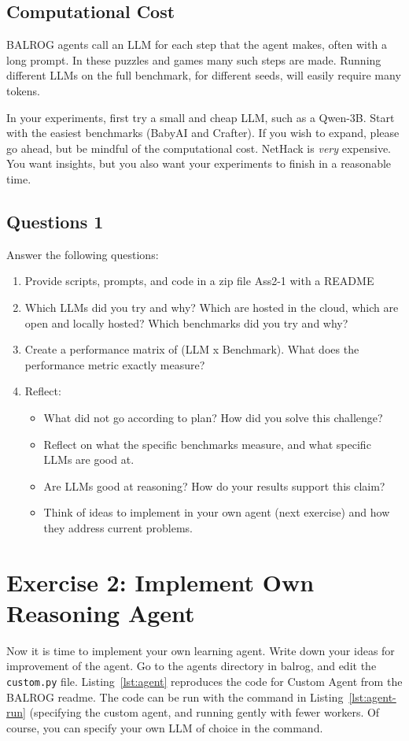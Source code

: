 \documentclass[a4]{article}
\begin{document}
\subsection{Computational Cost}
BALROG agents call an LLM for each step that the agent makes, often with a long prompt. In these puzzles and games many such steps are made. Running  different LLMs on the full benchmark, for different seeds, will easily require  many tokens. 

In your experiments, first try a small and cheap LLM, such as a Qwen-3B. Start with the easiest benchmarks (BabyAI and Crafter). If you wish to expand, please go ahead, but be mindful of the computational cost. NetHack is {\em very} expensive. You want insights, but you also want your experiments to finish in a reasonable time.

\subsection{Questions 1}
Answer the following questions:
\begin{enumerate}
 \item Provide scripts, prompts, and code in a zip file Ass2-1 with a README
\item Which LLMs did you try and why? Which are hosted in the cloud, which are open and locally hosted? Which benchmarks did you try and why? 
\item Create a performance matrix of (LLM x Benchmark). What does the performance metric exactly measure?
\item Reflect: 
\begin{itemize} 
\item What did not go according to plan? How did you solve this challenge? 
\item Reflect on what the specific benchmarks measure, and what specific LLMs are good at. 
\item Are LLMs good at reasoning? How do your results support this claim? 
\item Think of ideas to implement in your own agent (next exercise) and how they address current problems.
\end{itemize}
\end{enumerate}

\section{Exercise 2: Implement Own Reasoning Agent}
Now it is time to implement your own learning agent.
Write down your ideas for improvement of the agent.
Go to the agents directory in balrog, and edit the \verb|custom.py| file.
Listing~\ref{lst:agent} reproduces the code for Custom Agent from the BALROG readme. The code can be run with the command in Listing~\ref{lst:agent-run} (specifying the custom agent, and running gently with fewer workers. Of course, you can specify your own LLM of choice in the command.
\end{document}

